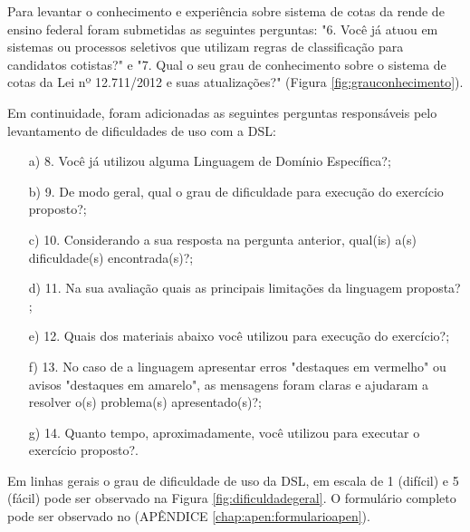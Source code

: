 

Para levantar o conhecimento e experiência sobre sistema de cotas da rende de ensino federal foram submetidas as seguintes perguntas: "6. Você já atuou em sistemas ou processos seletivos que utilizam regras de classificação para candidatos cotistas?" e "7. Qual o seu grau de conhecimento sobre o sistema de cotas da Lei nº 12.711/2012 e suas atualizações?" (Figura \ref{fig:grauconhecimento}).




Em continuidade, foram adicionadas as seguintes perguntas responsáveis pelo levantamento de dificuldades de uso com a DSL:

\begin{enumerate}
    \item[a)] 8. Você já utilizou alguma Linguagem de Domínio Específica?;
    
    \item[b)] 9. De modo geral, qual o grau de dificuldade para execução do exercício proposto?;
    
    \item[c)] 10. Considerando a sua resposta na pergunta anterior, qual(is) a(s) dificuldade(s) encontrada(s)?;
    
    \item[d)] 11. Na sua avaliação quais as principais limitações da linguagem proposta?  ;
    
   \item[e)]  12. Quais dos materiais abaixo você utilizou para execução do exercício?;
   
   \item[f)] 13. No caso de a linguagem apresentar erros "destaques em vermelho" ou avisos "destaques em amarelo", as mensagens foram claras e ajudaram a resolver o(s) problema(s) apresentado(s)?;
   
   \item[g)] 14. Quanto tempo, aproximadamente, você utilizou para executar o exercício proposto?.   

\end{enumerate}

Em linhas gerais o grau de dificuldade de uso da DSL, em escala de 1 (difícil) e 5 (fácil) pode ser observado na Figura \ref{fig:dificuldadegeral}. O formulário completo pode ser observado no (APÊNDICE \ref{chap:apen:formularioapen}). 



